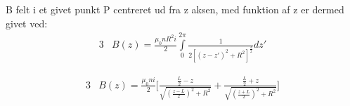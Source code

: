B felt i et givet punkt P centreret ud fra z aksen, med funktion af z er dermed givet ved:
\begin{alignat}{3}
	&B(z)=\frac{\mu_0 n R^2 i}{2}\int\limits_{0}^{2\pi}\frac{1}{2[(z-z')^2+R^2]^\frac{3}{2}}dz'
\end{alignat}

\begin{alignat}{3}
	&B(z)=\frac{\mu_0 n i}{2}\bigg[\frac{\frac{L}{2}-z}{\sqrt{(\frac{z-L}{2})^2+R^2}}+\frac{\frac{L}{2}+z}{\sqrt{(\frac{z+L}{2})^2+R^2}}\bigg]
\end{alignat}

